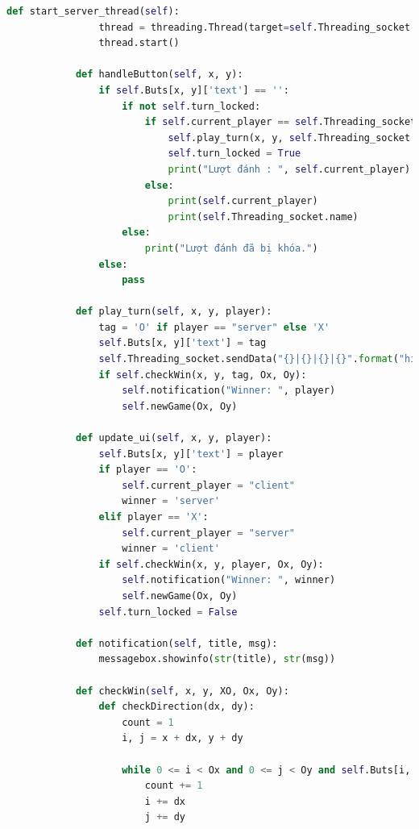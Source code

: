 \documentclass[a4paper]{article}
\begin{document}
\begin{lstlisting}[language=Python]
            def start_server_thread(self):
                thread = threading.Thread(target=self.Threading_socket.serverAction, args=(self.ip_label,))
                thread.start()
        
            def handleButton(self, x, y):
                if self.Buts[x, y]['text'] == '':
                    if not self.turn_locked:
                        if self.current_player == self.Threading_socket.name:
                            self.play_turn(x, y, self.Threading_socket.name)
                            self.turn_locked = True
                            print("Lượt đánh : ", self.current_player)
                        else:
                            print(self.current_player)
                            print(self.Threading_socket.name)
                    else:
                        print("Lượt đánh đã bị khóa.")
                else:
                    pass
        
            def play_turn(self, x, y, player):
                tag = 'O' if player == "server" else 'X'
                self.Buts[x, y]['text'] = tag
                self.Threading_socket.sendData("{}|{}|{}|{}".format("hit", x, y, tag))
                if self.checkWin(x, y, tag, Ox, Oy):
                    self.notification("Winner: ", player)
                    self.newGame(Ox, Oy)
        
            def update_ui(self, x, y, player):
                self.Buts[x, y]['text'] = player
                if player == 'O':
                    self.current_player = "client"
                    winner = 'server'
                elif player == 'X':
                    self.current_player = "server"
                    winner = 'client'
                if self.checkWin(x, y, player, Ox, Oy):
                    self.notification("Winner: ", winner)
                    self.newGame(Ox, Oy)
                self.turn_locked = False
        
            def notification(self, title, msg):
                messagebox.showinfo(str(title), str(msg))
        
            def checkWin(self, x, y, XO, Ox, Oy):
                def checkDirection(dx, dy):
                    count = 1
                    i, j = x + dx, y + dy
        
                    while 0 <= i < Ox and 0 <= j < Oy and self.Buts[i, j]["text"] == XO:
                        count += 1
                        i += dx
                        j += dy
        

\end{lstlisting}
\end{document}
